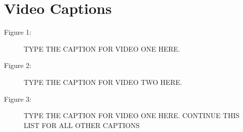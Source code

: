 \documentclass[review,authoryear,12pt]{elsarticle}
\begin{document}


\pagebreak

\section*{Video Captions}

\begin{description}
\item[Figure 1:]  TYPE THE CAPTION FOR VIDEO ONE HERE.
\item[Figure 2:]  TYPE THE CAPTION FOR VIDEO TWO HERE.
\item[Figure 3:]  TYPE THE CAPTION FOR VIDEO ONE HERE.  CONTINUE THIS LIST FOR ALL OTHER CAPTIONS
\end{description}
\end{document}
